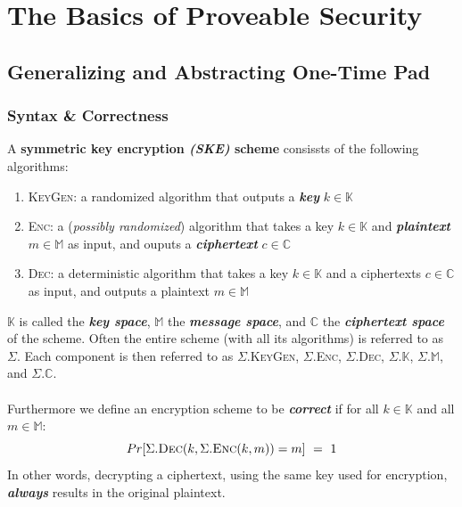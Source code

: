 \documentclass{article}
\begin{document}
	\section{The Basics of Proveable Security}
		\begin{adjustwidth}{2em}{}
			\subsection{Generalizing and Abstracting One-Time Pad}
			\begin{adjustwidth}{2em}{}
				\subsubsection{Syntax \& Correctness}
				\begin{adjustwidth}{2em}{4em}
					A \textbf{symmetric key encryption \textit{(SKE)} scheme} consissts of the following algorithms:
					\begin{enumerate}[$\triangleright$]
						\item \textsc{KeyGen}: a randomized algorithm that outputs a \textbf{\textit{key}} $k \in \mathbb{K}$
						\item \textsc{Enc}: a (\textit{possibly randomized}) algorithm that takes a key $k \in \mathbb{K}$ and \textbf{\textit{plaintext}} $m \in \mathbb{M}$ as input, and ouputs a \textbf{\textit{ciphertext}} $c \in \mathbb{C}$
						\item \textsc{Dec}: a deterministic algorithm that takes a key $k \in \mathbb{K}$ and a ciphertexts $c \in \mathbb{C}$ as input, and outputs a plaintext $m \in \mathbb{M}$
					\end{enumerate}
					$\mathbb{K}$ is called the \textbf{\textit{key space}}, $\mathbb{M}$ the \textbf{\textit{message space}}, and $\mathbb{C}$ the \textbf{\textit{ciphertext space}} of the scheme. Often the entire scheme (with all its algorithms) is referred to as $\Sigma$. Each component is then referred to as $\Sigma$.\textsc{KeyGen}, $\Sigma$.\textsc{Enc}, $\Sigma$.\textsc{Dec}, $\Sigma.\mathbb{K}$, $\Sigma.\mathbb{M}$, and $\Sigma.\mathbb{C}$. \\ \\
					Furthermore we define an encryption scheme to be \textbf{\textit{correct}} if for all $k \in \mathbb{K}$ and all $m \in \mathbb{M}$:
					\[
						Pr[\Sigma.\textsc{Dec}(k, \Sigma.\textsc{Enc}(k, m))=m] \ = \ 1 
					\]
					In other words, decrypting a ciphertext, using the same key used for encryption, \textbf{\textit{always}} results in the original plaintext.
				\end{adjustwidth}
			\end{adjustwidth}
			\newpage

\end{adjustwidth}
\end{document}
